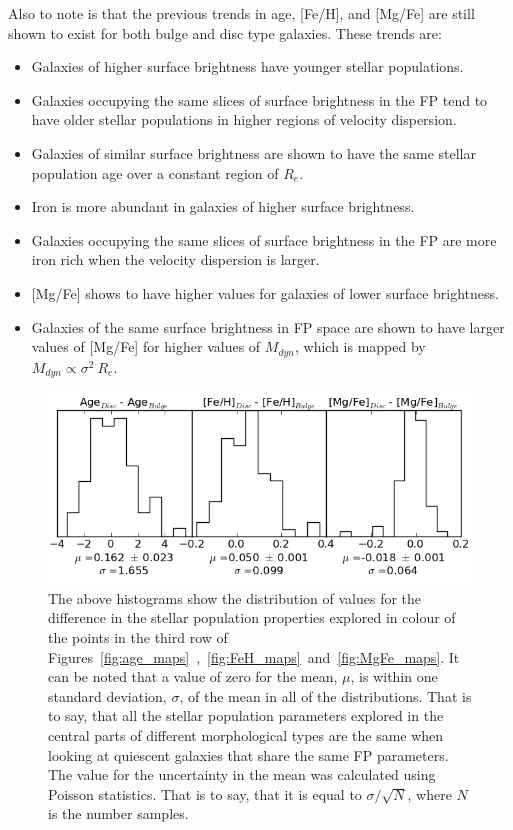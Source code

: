 \documentclass[showcase, preprintnumbers, amsmath, amssymb, bibnotes, 12pt]{revtex4}
\begin{document}
Also to note is that the previous trends in age, [Fe/H], and [Mg/Fe] are still shown to exist for both bulge and disc type galaxies. These trends are:

\begin{itemize}
\item Galaxies of higher surface brightness have younger stellar populations.
\item Galaxies occupying the same slices of surface brightness in the FP tend to have older stellar populations in higher regions of velocity dispersion.
\item Galaxies of similar surface brightness are shown to have the same stellar population age over a constant region of $R_e$.
\item Iron is more abundant in galaxies of higher surface brightness.
\item Galaxies occupying the same slices of surface brightness in the FP are more iron rich when the velocity dispersion is larger.
\item {[Mg/Fe] shows to have higher values for galaxies of lower surface brightness.}
\item Galaxies of the same surface brightness in FP space are shown to have larger values of [Mg/Fe] for higher values of $M_{dyn}$, which is mapped by $M_{dyn}\propto \sigma^2 \ R_e$.
\end{itemize}


\begin{figure}
\begin{center}
\includegraphics[scale=0.62]{3panel_Delta_hist.png}
\end{center}
\caption{The above histograms show the distribution of values for the difference in the stellar population properties explored in colour of the points in the third row of Figures~\ref{fig:age_maps}~,~\ref{fig:FeH_maps}~and~\ref{fig:MgFe_maps}. It can be noted that a value of zero for the mean, $\mu$, is within one standard deviation, $\sigma$, of the mean in all of the distributions. That is to say, that all the stellar population parameters explored in the central parts of different morphological types are the same when looking at quiescent galaxies that share the same FP parameters. The value for the uncertainty in the mean was calculated using Poisson statistics. That is to say, that it is equal to $\sigma/\sqrt{N}$, where $N$ is the number samples. \label{fig:Delta_hist}}
\end{figure}
\end{document}
